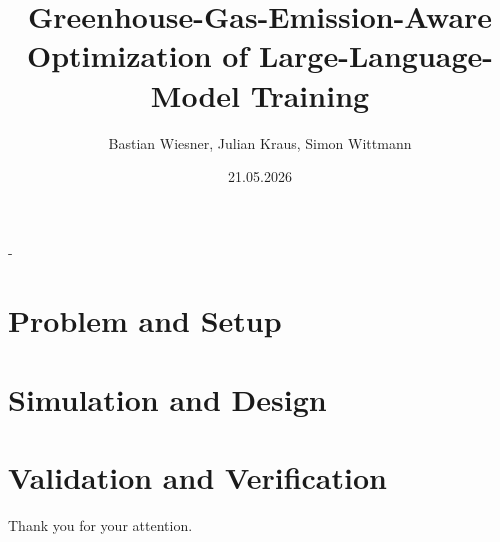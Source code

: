 \documentclass[final]{beamer}
\title[Short title]{Greenhouse-Gas-Emission-Aware Optimization
  of
Large-Language-Model Training}
\author[Short form author 1]{
  Bastian Wiesner, Julian Kraus, Simon Wittmann%
}
\institute[FAU]{%
  Friedrich-Alexander-Universität Erlangen-Nürnberg, Computer Science 7%
}
\date{21.05.2026}
\begin{document}
\begin{frame}[t,titleimagenofooter]{-}
  \titlepage%
\end{frame}

%

\section{Problem and Setup}









% 

\section{Simulation and Design}




\section{Validation and Verification}


%
%


\begin{frame}[titleimagenofooter]{}{}
  \centering
  Thank you for your attention.
\end{frame}


\end{document}
